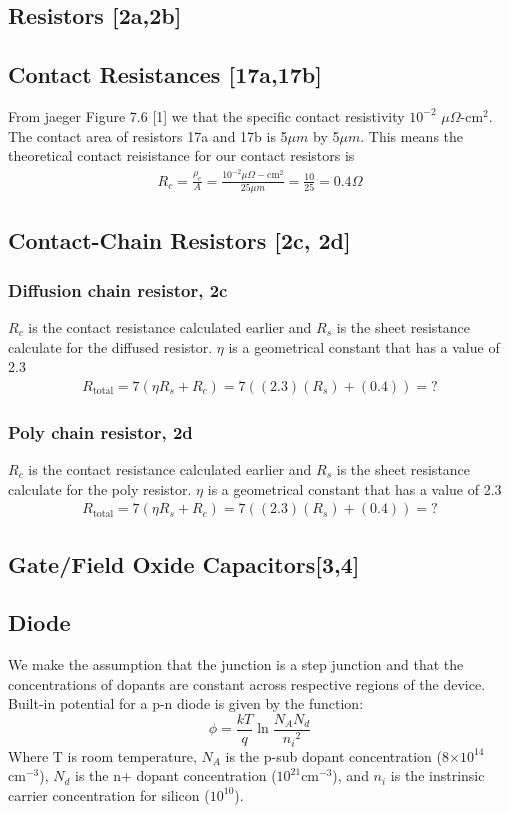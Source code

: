 \documentclass{article}
\providecommand{\e}[1]{\ensuremath{\times 10^{#1}}}
\begin{document}
\subsection{Resistors [2a,2b]}


\subsection{Contact Resistances [17a,17b]}
From jaeger Figure 7.6 [1] we that the specific contact resistivity $10^{-2}$ $\mu \Omega$-$\text{cm}^2$. The contact area of resistors 17a and 17b is 5$\mu m$ by 5$\mu m$. This means the theoretical contact reisistance for our contact resistors is
\begin{align*}
R_c = \frac{\rho_c}{A} = \frac{10^{-2} \mu \Omega-\text{cm}^2}{25 \mu m} = \frac{10}{25} = 0.4 \Omega
\end{align*}


\subsection{Contact-Chain Resistors [2c, 2d]}
\subsubsection{Diffusion chain resistor, 2c}
$R_c$ is the contact resistance calculated earlier and $R_s$ is the sheet resistance calculate for the diffused resistor. $\eta$ is a geometrical constant that has a value of 2.3
\begin{align*}
R_{\text{total}} = 7(\eta R_s + R_c) = 7((2.3)(R_s) + (0.4)) = ?
\end{align*}
\subsubsection{Poly chain resistor, 2d}
$R_c$ is the contact resistance calculated earlier and $R_s$ is the sheet resistance calculate for the poly resistor. $\eta$ is a geometrical constant that has a value of 2.3
\begin{align*}
R_{\text{total}} = 7(\eta R_s + R_c) = 7((2.3)(R_s) + (0.4)) = ?
\end{align*}


\subsection{Gate/Field Oxide Capacitors[3,4]}

\subsection{Diode}
We make the assumption that the junction is a step junction and that the concentrations of dopants are constant across respective regions of the device. Built-in potential for a p-n diode is given by the function:
\begin{equation}
\phi = \frac{kT}{q}\ln{\frac{N_AN_d}{{n_i}^{2}}}
\end{equation}
Where T is room temperature, $N_A$ is the p-sub dopant concentration (8\e{14}${\text{cm}^{-3}}$), $N_d$ is the n+ dopant concentration ($10^{21}{\text{cm}^{-3}}$), and $n_i$ is the instrinsic carrier concentration for silicon ($10^{10}$).
\end{document}

